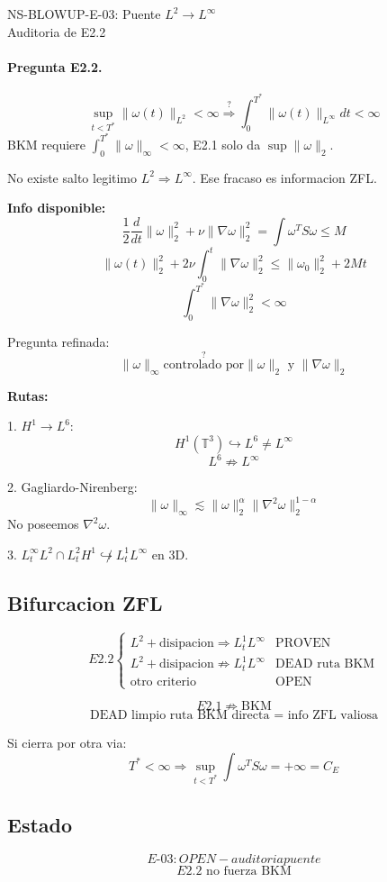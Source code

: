 \documentclass[11pt]{article}
\begin{document}
\begin{center}
{\Large NS-BLOWUP-E-03: Puente $L^2\to L^\infty$}\\
Auditoria de E2.2
\end{center}

\paragraph{Pregunta E2.2.}
\[
\boxed{\sup_{t<T^*}\|\omega(t)\|_{L^2}<\infty\stackrel{?}{\Rightarrow}\int_0^{T^*}\|\omega(t)\|_{L^\infty}dt<\infty}
\]
BKM requiere $\int_0^{T^*}\|\omega\|_\infty<\infty$, E2.1 solo da $\sup\|\omega\|_2$.

No existe salto legitimo $L^2\Rightarrow L^\infty$. Ese fracaso es informacion ZFL.

\textbf{Info disponible:}
\[
\frac12\frac d{dt}\|\omega\|_2^2+\nu\|\nabla\omega\|_2^2=\int\omega^T S\omega\le M
\]
\[
\|\omega(t)\|_2^2+2\nu\int_0^t\|\nabla\omega\|_2^2\le\|\omega_0\|_2^2+2Mt
\]
\[
\boxed{\int_0^{T^*}\|\nabla\omega\|_2^2<\infty}
\]

Pregunta refinada:
\[
\boxed{\|\omega\|_\infty\stackrel{?}{\text{controlado por}}\|\omega\|_2\text{ y }\|\nabla\omega\|_2}
\]

\textbf{Rutas:}

1. $H^1\to L^6$:
\[
H^1(\mathbb T^3)\hookrightarrow L^6\neq L^\infty
\]
\[
\boxed{L^6\not\Rightarrow L^\infty}
\]

2. Gagliardo-Nirenberg:
\[
\|\omega\|_\infty\lesssim\|\omega\|_2^{\alpha}\|\nabla^2\omega\|_2^{1-\alpha}
\]
No poseemos $\nabla^2\omega$.

3. $L^\infty_tL^2\cap L^2_tH^1\not\hookrightarrow L^1_tL^\infty$ en 3D.

\subsection*{Bifurcacion ZFL}
\[
E2.2\begin{cases}
L^2+\text{disipacion}\Rightarrow L^1_tL^\infty &\text{PROVEN}\\
L^2+\text{disipacion}\not\Rightarrow L^1_tL^\infty &\text{DEAD ruta BKM}\\
\text{otro criterio} &\text{OPEN}
\end{cases}
\]

\[
\boxed{E2.1\not\Rightarrow\text{BKM}}
\]
\[
\boxed{\text{DEAD limpio ruta BKM directa = info ZFL valiosa}}
\]

Si cierra por otra via:
\[
\boxed{T^*<\infty\Rightarrow\sup_{t<T^*}\int\omega^T S\omega=+\infty=C_E}
\]

\subsection*{Estado}
\[
\boxed{E\text{-}03: OPEN - auditoria puente}
\]
\[
\boxed{E2.2\text{ no fuerza BKM}}
\]
\end{document}
